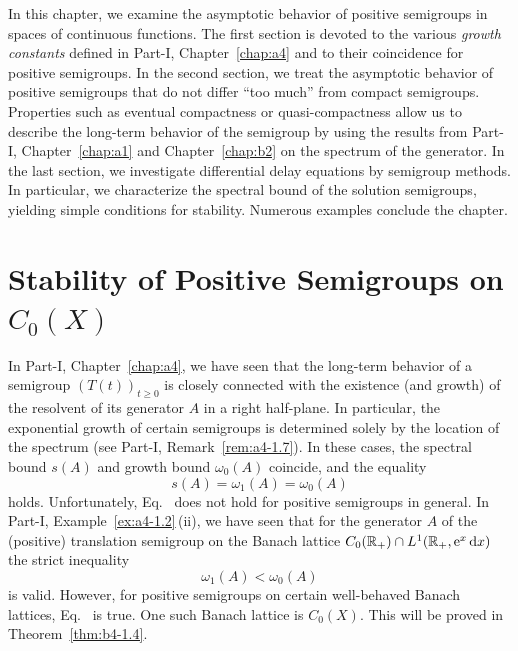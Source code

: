 \setcounter{section}{0}
\label{chap:b4}
\thispagestyle{empty}
In this chapter, we examine the asymptotic behavior%
of positive semigroups in spaces of continuous functions.
The first section is devoted to the various \emph{growth constants} defined in Part-I, Chapter~\ref{chap:a4} and to their coincidence for positive semigroups.
In the second section, we treat the asymptotic behavior of positive semigroups that do not differ \enquote{too much} from compact semigroups.
Properties such as eventual compactness or quasi-compactness allow us to describe the long-term behavior of the semigroup by using the results from Part-I, Chapter~\ref{chap:a1} and Chapter~\ref{chap:b2} on the spectrum of the generator.
In the last section, we investigate differential delay equations by semigroup methods. 
In particular, we characterize the spectral bound of the solution semigroups, yielding simple conditions for stability. 
Numerous examples conclude the chapter.
\section{Stability of Positive Semigroups on \texorpdfstring{$C_{0}(X)$}{C₀(X)}}\label{sec:b4-1}%
\hspace{1cm}{\Large by Frank Neubrander}
\vspace{.5cm}
\newline
In Part-I, Chapter~\ref{chap:a4}, we have seen that the long-term behavior of a semigroup $(T(t))_{t \geq 0}$ is closely connected with the existence (and growth) of the resolvent of its generator $A$ in a right half-plane.
In particular, the exponential growth of certain semigroups is determined solely by the location of the spectrum (see Part-I, Remark~\ref{rem:a4-1.7}).
In these cases, the spectral bound%
$s(A)$ and growth bound%
$\omega_{0}(A)$ coincide, and the equality
\begin{equation}\label{eq:b4-1.1}
   s(A) = \omega_1(A) = \omega_{0}(A)
\end{equation}
holds.
Unfortunately, Eq.~ does not hold for positive semigroups in general.
In Part-I, Example~\ref{ex:a4-1.2}\,(ii), we have seen that for the generator $A$ of the (positive) translation semigroup on the Banach lattice $C_{0}(\mathbb{R}_+) \cap L^1(\mathbb{R}_+,\mathrm{e}^x \mathop{}\!\mathrm{d}{x})$ the strict inequality 
\[
\omega_1(A) < \omega_{0}(A)
\]
is valid.
However, for positive semigroups on certain well-behaved Banach lattices, Eq.~ is true.
One such Banach lattice is $C_{0}(X)$. 
This will be proved in Theorem~\ref{thm:b4-1.4}.

